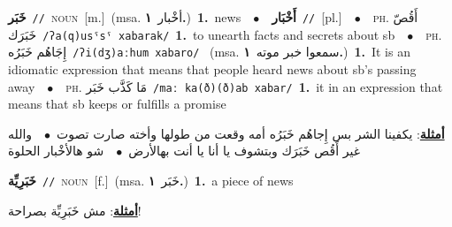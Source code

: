 \documentclass[10pt,a4paper,twoside]{article} %
\begin{document}
\begin{multicols}{2}
{\setlength\topsep{0pt}\textbf{\foreignlanguage{arabic}{خَبَر}}\ {\color{gray}\texttt{//}\color{black}}\ \textsc{noun}\ [m.]\ \color{gray}(msa. \foreignlanguage{arabic}{أخْبار}~\foreignlanguage{arabic}{\textbf{١.}})\color{black}\ \textbf{1.}~news\ \ $\bullet$\ \ \setlength\topsep{0pt}\textbf{\foreignlanguage{arabic}{أَخْبَار}}\ {\color{gray}\texttt{//}\color{black}}\ [pl.]\ \ $\bullet$\ \ \textsc{ph.} \color{gray} \foreignlanguage{arabic}{أَقُصّ خَبَرَك}\color{black}\ {\color{gray}\texttt{/{\sffamily ʔa(q)usˤsˤ xabarak}/}\color{black}}\ \textbf{1.}~to unearth facts and secrets about sb\ \ $\bullet$\ \ \textsc{ph.} \color{gray} \foreignlanguage{arabic}{إِجَاهُم خَبَرُه}\color{black}\ {\color{gray}\texttt{/{\sffamily ʔi(dʒ)aːhum xabaro}/}\color{black}}\ \color{gray} (msa. \foreignlanguage{arabic}{سمعوا خبر موته}~\foreignlanguage{arabic}{\textbf{١.}})\color{black}\ \textbf{1.}~It is an idiomatic expression that means that people heard news about sb's passing away\ \ $\bullet$\ \ \textsc{ph.} \color{gray} \foreignlanguage{arabic}{مَا كَذَّب خَبَر}\color{black}\ {\color{gray}\texttt{/{\sffamily maː ka(ð)(ð)ab xabar}/}\color{black}}\ \textbf{1.}~it in an expression that means that sb keeps or fulfills a promise\  \begin{flushright}\color{gray}\foreignlanguage{arabic}{\textbf{\underline{\foreignlanguage{arabic}{أمثلة}}}: يكفينا الشر بس إِجاهُم خَبَرُه أمه وقعت من طولها وأخته صارت تصوت\ $\bullet$\ \  والله غير أَقُص خَبَرَك وبتشوف يا أنا يا أنت بهالأرض\ $\bullet$\ \  شو هالأخْبار الحلوة}\end{flushright}\color{black}} \vspace{2mm}

{\setlength\topsep{0pt}\textbf{\foreignlanguage{arabic}{خَبَرِيِّة}}\ {\color{gray}\texttt{//}\color{black}}\ \textsc{noun}\ [f.]\ \color{gray}(msa. \foreignlanguage{arabic}{خَبَر}~\foreignlanguage{arabic}{\textbf{١.}})\color{black}\ \textbf{1.}~a piece of news\  \begin{flushright}\color{gray}\foreignlanguage{arabic}{\textbf{\underline{\foreignlanguage{arabic}{أمثلة}}}: مش خَبَرِيِّة بصراحة!}\end{flushright}\color{black}} \vspace{2mm}


\end{multicols}
\end{document}
